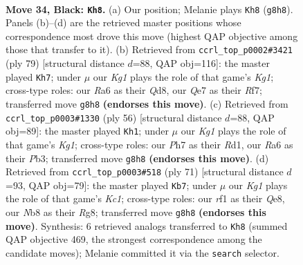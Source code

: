 \documentclass[11pt]{article}
\begin{document}
\clearpage

\begin{figure}[p]\centering
\begin{subfigure}{0.46\textwidth}\centering
\resizebox{\linewidth}{!}{%
\newchessgame
\chessboard[
  setfen={1n3rk1/2pnq2p/rp2p1p1/p3Pp2/P2P1P1P/1RP3N1/2K3PQ/4NR2 b - - 10 34},
  showmover=false,
  pgfstyle=straightmove, color=movearrow, markmove={g8-h8}
]}
\caption{}
\end{subfigure}\hfill
\begin{subfigure}{0.46\textwidth}\centering
\resizebox{\linewidth}{!}{%
\newchessgame
\chessboard[
  setfen={3q1rk1/R1p1nrp1/1p1pp2p/1Pn1p2P/2P1P1NN/3P2P1/R4PK1/3Q4 b - - 4 40},
  showmover=false,
  pgfstyle=straightmove, color=movearrow, markmove={g8-h7}
]}
\caption{}
\end{subfigure}
\\[4pt]
\begin{subfigure}{0.46\textwidth}\centering
\resizebox{\linewidth}{!}{%
\newchessgame
\chessboard[
  setfen={2r5/2qr1ppk/pp1ppnnp/8/2P1P3/1PNRQN1P/P4PP1/3R2K1 w - - 2 29},
  showmover=false,
  pgfstyle=straightmove, color=movearrow, markmove={g1-h1}
]}
\caption{}
\end{subfigure}\hfill
\begin{subfigure}{0.46\textwidth}\centering
\resizebox{\linewidth}{!}{%
\newchessgame
\chessboard[
  setfen={2k1q1r1/2nr1npp/p3p3/Pp1pPp1P/1BpP1N1Q/2P3R1/2P2PP1/2K4R b - - 37 36},
  showmover=false,
  pgfstyle=straightmove, color=movearrow, markmove={c8-b7}
]}
\caption{}
\end{subfigure}
\caption{\textbf{Move 34, Black: \texttt{Kh8}.} (a) Our position; Melanie plays \texttt{Kh8} (\texttt{g8h8}). Panels (b)--(d) are the retrieved master positions whose correspondence most drove this move (highest QAP objective among those that transfer to it). (b) Retrieved from \texttt{ccrl\_top\_p0002\#3421} (ply 79) [structural distance $d$=88, QAP obj=116]: the master played \texttt{Kh7}; under $\mu$ our \emph{Kg1} plays the role of that game's \emph{Kg1}; cross-type roles: our \emph{R}a6 as their \emph{Q}d8, our \emph{Q}e7 as their \emph{R}f7; transferred move \texttt{g8h8} \textbf{(endorses this move)}. (c) Retrieved from \texttt{ccrl\_top\_p0003\#1330} (ply 56) [structural distance $d$=88, QAP obj=89]: the master played \texttt{Kh1}; under $\mu$ our \emph{Kg1} plays the role of that game's \emph{Kg1}; cross-type roles: our \emph{P}h7 as their \emph{R}d1, our \emph{R}a6 as their \emph{P}b3; transferred move \texttt{g8h8} \textbf{(endorses this move)}. (d) Retrieved from \texttt{ccrl\_top\_p0003\#518} (ply 71) [structural distance $d$=93, QAP obj=79]: the master played \texttt{Kb7}; under $\mu$ our \emph{Kg1} plays the role of that game's \emph{Kc1}; cross-type roles: our \emph{r}f1 as their \emph{Q}e8, our \emph{N}b8 as their \emph{R}g8; transferred move \texttt{g8h8} \textbf{(endorses this move)}. Synthesis: 6 retrieved analogs transferred to \texttt{Kh8} (summed QAP objective 469, the strongest correspondence among the candidate moves); Melanie committed it via the \texttt{search} selector.}
\label{fig:thought-m67}
\end{figure}
\end{document}
